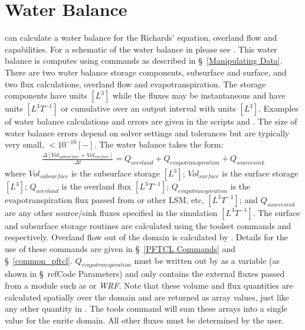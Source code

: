 \section{Water Balance}
\label{Water Balance}
\parflow{} can calculate a water balance for the Richards' equation, overland flow and  capabilities. For a schematic of the water balance in \parflow{} please see \cite{M10}. This water balance is computes using  commands as described in \S~\ref{Manipulating Data}.  There are two water balance storage components, subsurface and surface, and two flux calculations, overland flow and evapotranspiration.  The storage components have units $[L^3]$ while the fluxes may be instantaneous and have units $[L^3T^{-1}]$ or cumulative over an output interval with units $[L^3]$.  Examples of water balance calculations and errors are given in the scripts  and .  The size of water balance errors depend on solver settings and tolerances but are typically very small, $<10^{-10} [-]$.\newline
The water balance takes the form:
\begin{eqnarray}
\frac{\Delta [Vol_{subsurface} + Vol_{surface}]}{\Delta t} = Q_{overland} + Q_{evapotranspiration} + Q_{source sink}
\label{eq:balance}
\end{eqnarray}
where $Vol_{subsurface}$ is the subsurface storage $[L^3]$; $Vol_{surface}$ is the surface storage $[L^3]$; $Q_{overland}$ is the overland flux $[L^3 T^{-1}]$; $Q_{evapotranspiration}$ is the evapotranspiration flux passed from  or other LSM, etc, $[L^3 T^{-1}]$; and $Q_{source sink}$ are any other source/sink fluxes specified in the simulation $[L^3 T^{-1}]$. The surface and subsurface storage routines are calculated using the \parflow{} toolset commands  and  respectively.  Overland flow out of the domain is calculated by .  Details for the use of these commands are given in \S~\ref{PFTCL Commands} and \S~\ref{common_pftcl}. $Q_{evapotranspiration}$ must be written out by \parflow{} as a variable (as shown in \S~ref{Code Parameters}) and only contains the external fluxes passed from a module such as  or \emph{WRF}. Note that these volume and flux quantities are calculated spatially over the domain and are returned as array values, just like any other quantity in \parflow{}.  The tools command  will sum these arrays into a single value for the enrite domain. All other fluxes must be determined by the user.\newline
